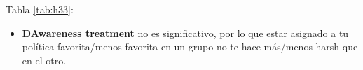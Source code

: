 \documentclass[12pt,a4]{article}
\newcommand{\tabpath}{../3. Output/tables/}
\begin{document}
	Tabla \ref{tab:h33}:
	
	\begin{itemize}
		\item \textbf{DAwareness treatment} no es significativo, por lo que estar asignado a tu política favorita/menos favorita en un grupo no te hace más/menos harsh que en el otro.
	\end{itemize}
	
	\begin{table}
		\caption{Hipótesis H31 y H32}
			
		\label{tab:h3}
	\end{table}
	
	\begin{table}
		\caption{Hipótesis H32}
			
		\label{tab:h32}
	\end{table}
	
	\begin{table}
		\caption{Hipótesis H33}
			
		\label{tab:h33}
	\end{table}
	
\end{document}
